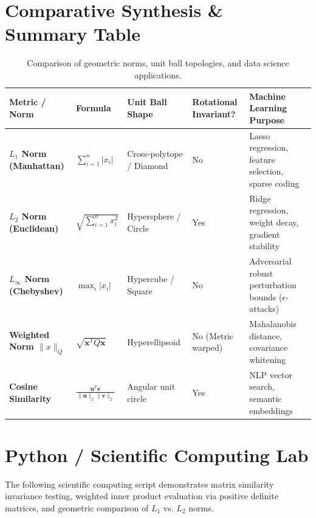 \section{Comparative Synthesis \& Summary Table}

\begin{table}[htbp]
\centering
\small
\begin{tabular}{p{2.8cm} p{2.4cm} p{3.0cm} p{2.2cm} p{3.4cm}}
\toprule
\textbf{Metric / Norm} & \textbf{Formula} & \textbf{Unit Ball Shape} & \textbf{Rotational Invariant?} & \textbf{Machine Learning Purpose} \\
\midrule
\textbf{$L_1$ Norm (Manhattan)} & $\sum_{i=1}^n |x_i|$ & Cross-polytope / Diamond & No & Lasso regression, feature selection, sparse coding \\
\textbf{$L_2$ Norm (Euclidean)} & $\sqrt{\sum_{i=1}^n x_i^2}$ & Hypersphere / Circle & Yes & Ridge regression, weight decay, gradient stability \\
\textbf{$L_\infty$ Norm (Chebyshev)} & $\max_{i} |x_i|$ & Hypercube / Square & No & Adversarial robust perturbation bounds ($\epsilon$-attacks) \\
\textbf{Weighted Norm $\|x\|_Q$} & $\sqrt{\mathbf{x}^T Q \mathbf{x}}$ & Hyperellipsoid & No (Metric warped) & Mahalanobis distance, covariance whitening \\
\textbf{Cosine Similarity} & $\frac{\mathbf{u}^T \mathbf{v}}{\|\mathbf{u}\|_2 \|\mathbf{v}\|_2}$ & Angular unit circle & Yes & NLP vector search, semantic embeddings \\
\bottomrule
\end{tabular}
\caption{Comparison of geometric norms, unit ball topologies, and data science applications.}
\label{tab:norms_metrics_comparison}
\end{table}

\section{Python / Scientific Computing Lab}

The following scientific computing script demonstrates matrix similarity invariance testing, weighted inner product evaluation via positive definite matrices, and geometric comparison of $L_1$ vs. $L_2$ norms.


